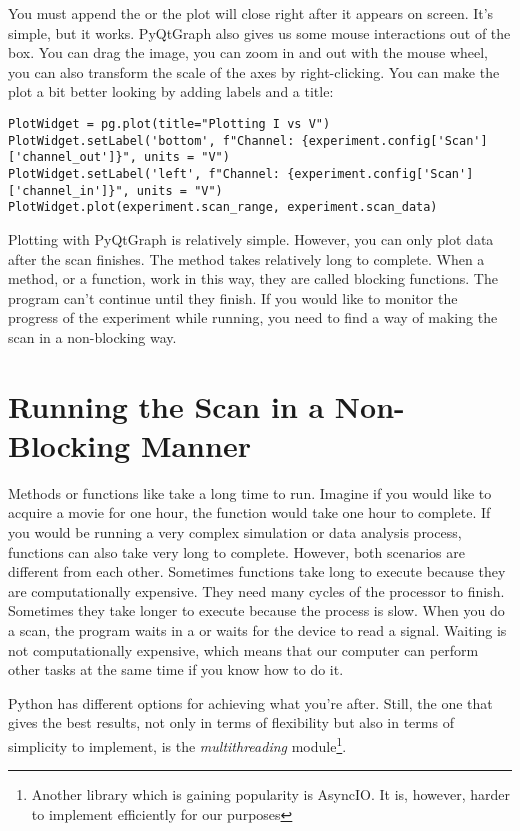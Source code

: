 You must append the  or the plot will close right after it appears on screen. It's simple, but it works. PyQtGraph also gives us some mouse interactions out of the box. You can drag the image, you can zoom in and out with the mouse wheel, you can also transform the scale of the axes by right-clicking. You can make the plot a bit better looking by adding labels and a title:

\begin{verbatim}
PlotWidget = pg.plot(title="Plotting I vs V")
PlotWidget.setLabel('bottom', f"Channel: {experiment.config['Scan']['channel_out']}", units = "V")
PlotWidget.setLabel('left', f"Channel: {experiment.config['Scan']['channel_in']}", units = "V")
PlotWidget.plot(experiment.scan_range, experiment.scan_data)
\end{verbatim}

Plotting with PyQtGraph is relatively simple. However, you can only plot data after the scan finishes. The  method takes relatively long to complete. When a method, or a function, work in this way, they are called blocking functions. The program can't continue until they finish. If you would like to monitor the progress of the experiment while running, you need to find a way of making the scan in a non-blocking way.

\section{Running the Scan in a Non-Blocking Manner}\label{sec:nonblocking}
Methods or functions like  take a long time to run. Imagine if you would like to acquire a movie for one hour, the function would take one hour to complete. If you would be running a very complex simulation or data analysis process, functions can also take very long to complete. However, both scenarios are different from each other. Sometimes functions take long to execute because they are computationally expensive. They need many cycles of the processor to finish. Sometimes they take longer to execute because the process is slow. When you do a scan, the program waits in a  or waits for the device to read a signal. Waiting is not computationally expensive, which means that our computer can perform other tasks at the same time if you know how to do it.

Python has different options for achieving what you're after. Still, the one that gives the best results, not only in terms of flexibility but also in terms of simplicity to implement, is the \emph{multithreading} module\footnote{Another library which is gaining popularity is AsyncIO. It is, however, harder to implement efficiently for our purposes}.

